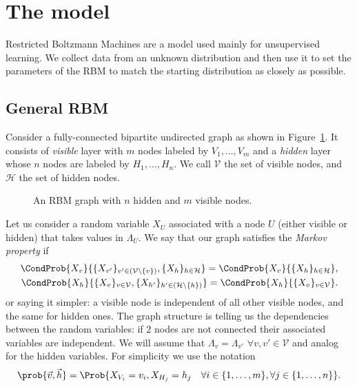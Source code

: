 \section{The model}
  Restricted Boltzmann Machines are a model used mainly for unsupervised learning. We collect
  data from an unknown distribution and then use it to set the parameters of the RBM to match
  the starting distribution as closely as possible.
  
  \subsection{General RBM}
  Consider a fully-connected bipartite undirected graph as shown in Figure~\ref{fig:generalRBM}.
  It consists of \emph{visible} layer with $m$ nodes labeled by \(V_1, \dots, V_m\) and a
  \emph{hidden} layer whose \(n\) nodes are labeled by \(H_1, \dots, H_n\). We call \(\mathcal{V}\)
  the set of visible nodes, and \(\mathcal{H}\) the set of hidden nodes.
  \begin{figure}
    \centering
    \resizebox{\textwidth}{!}{}
    \caption{An RBM graph with \(n\) hidden and \(m\) visible nodes.}
    \label{fig:generalRBM}
  \end{figure}
  Let us consider a random variable \(X_U\) associated with a node \(U\) (either visible or hidden)
  that takes values in \(\Lambda_U\). We say that our graph satisfies the \emph{Markov
  property} if 
  \begin{align*}
    \CondProb{X_v}{\{X_{v'}\}_{v'\in (\mathcal{V} \setminus \{v\})}, \{X_h\}_{h\in \mathcal{H}}} =
    \CondProb{X_v}{\{X_h\}_{h\in \mathcal{H}}}, \\
    \CondProb{X_h}{\{X_v\}_{v\in \mathcal{V}}, \{X_{h'}\}_{h'\in (\mathcal{H} \setminus \{h\})}} =
    \CondProb{X_h}{\{X_v\}_{v\in \mathcal{V}}}.
  \end{align*}
  or saying it simpler: a visible node is independent of all other visible nodes,
  and the same for hidden ones. The graph structure is telling us the dependencies between
  the random variables: if 2 nodes are not connected their associated variables are independent.
  We will assume that \(\Lambda_v = \Lambda_{v'} \,\, \forall v,v' \in \mathcal{V}\) and analog
  for the hidden variables. For simplicity we use the notation
  \[\prob{\vec{v}, \vec{h}} = \Prob{X_{V_i} = v_i, X_{H_j} = h_j
                                    \quad\forall i \in \{1,\dots,m\}, \forall j \in \{1,\dots,n\}}.\]
  

